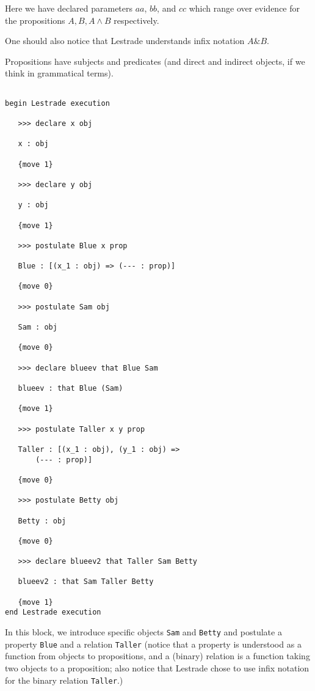 \documentclass[12pt]{article}
\begin{document}
Here we have declared parameters $aa$, $bb$, and $cc$ which range over evidence for the propositions $A, B, A \wedge B$ respectively.

One should also notice that Lestrade understands infix notation $A \& B$.

Propositions have subjects and predicates (and direct and indirect objects, if we think in grammatical terms).

\begin{verbatim}

begin Lestrade execution

   >>> declare x obj

   x : obj

   {move 1}

   >>> declare y obj

   y : obj

   {move 1}

   >>> postulate Blue x prop

   Blue : [(x_1 : obj) => (--- : prop)]

   {move 0}

   >>> postulate Sam obj

   Sam : obj

   {move 0}

   >>> declare blueev that Blue Sam

   blueev : that Blue (Sam)

   {move 1}

   >>> postulate Taller x y prop

   Taller : [(x_1 : obj), (y_1 : obj) => 
       (--- : prop)]

   {move 0}

   >>> postulate Betty obj

   Betty : obj

   {move 0}

   >>> declare blueev2 that Taller Sam Betty

   blueev2 : that Sam Taller Betty

   {move 1}
end Lestrade execution

\end{verbatim}

In this block, we introduce specific objects {\tt Sam} and {\tt Betty} and postulate a property {\tt Blue} and a relation {\tt Taller} (notice that a property is understood as a function from objects to propositions, and a (binary) relation is a function taking two objects to a proposition; also notice that Lestrade chose to use infix notation for the binary relation {\tt Taller}.)
\end{document}
